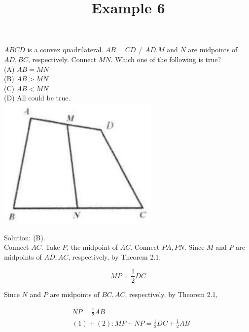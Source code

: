 \documentclass{article}
\title{Example 6}
\date{}
\begin{document}
\maketitle

\(A B C D\) is a convex quadrilateral. \(A B=C D \neq A D . M\) and \(N\) are midpoints of \(A D, B C\), respectively. Connect \(M N\). Which one of the following is true?\\
(A) \(A B=M N\)\\
(B) \(A B>M N\)\\
(C) \(A B<M N\)\\
(D) All could be true.\\
\centering
\includegraphics[width=\textwidth]{images/problem_image_1.jpg}

Solution: (B).\\
Connect \(A C\). Take \(P\), the midpoint of \(A C\). Connect \(P A, P N\). Since \(M\) and \(P\) are midpoints of \(A D, A C\), respectively, by Theorem 2.1,

\[
M P=\frac{1}{2} D C
\]

Since \(N\) and \(P\) are midpoints of \(B C, A C\), respectively, by Theorem 2.1,

\[
\begin{aligned}
& N P=\frac{1}{2} A B \\
& (1)+(2): M P+N P=\frac{1}{2} D C+\frac{1}{2} A B
\end{aligned}
\]
\end{document}
